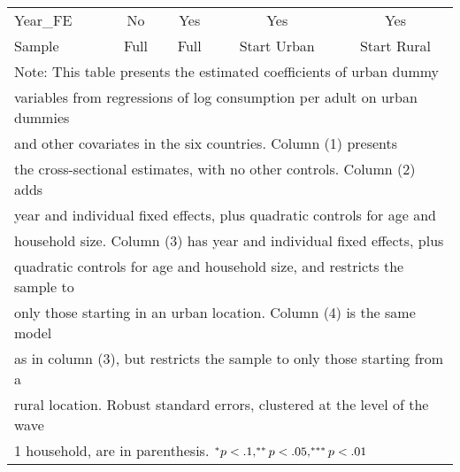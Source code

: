 \begin{table}[htbp]
\begin{tabular}{l*{4}{c}}
Year\_FE             &          No         &         Yes         &         Yes         &         Yes         \\
Sample              &        Full         &        Full         & Start Urban         & Start Rural         \\
\bottomrule
\multicolumn{5}{l}{\footnotesize Note: This table presents the estimated coefficients of urban dummy}\\
\multicolumn{5}{l}{\footnotesize variables from regressions of log consumption per adult on urban dummies}\\
\multicolumn{5}{l}{\footnotesize and other covariates in the six countries. Column (1) presents}\\
\multicolumn{5}{l}{\footnotesize the cross-sectional estimates, with no other controls. Column (2) adds}\\
\multicolumn{5}{l}{\footnotesize year and individual fixed effects, plus quadratic controls for age and}\\
\multicolumn{5}{l}{\footnotesize household size. Column (3) has year and individual fixed effects, plus}\\
\multicolumn{5}{l}{\footnotesize quadratic controls for age and household size, and restricts the sample to}\\
\multicolumn{5}{l}{\footnotesize only those starting in an urban location. Column (4) is the same model}\\
\multicolumn{5}{l}{\footnotesize as in column (3), but restricts the sample to only those starting from a}\\
\multicolumn{5}{l}{\footnotesize rural location. Robust standard errors, clustered at the level of the wave}\\
\multicolumn{5}{l}{\footnotesize 1 household, are in parenthesis. $\sym{*} p<.1, \sym{**}p<.05, \sym{***}p<.01$}\\
\end{tabular}
\end{table}
